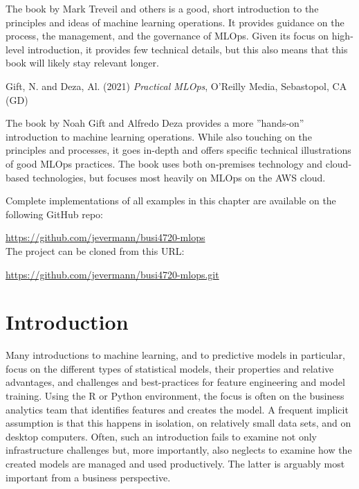 The book by Mark Treveil and others is a good, short introduction to the principles and ideas of machine learning operations. It provides guidance on the process, the management, and the governance of MLOps. Given its focus on high-level introduction, it provides few technical details, but this also means that this book will likely stay relevant longer. 


\begin{resourcebox}
Gift, N. and Deza, Al. (2021) \emph{Practical MLOps}, O'Reilly Media, Sebastopol, CA (GD)
\end{resourcebox}

The book by Noah Gift and Alfredo Deza provides a more ''hands-on'' introduction to machine learning operations. While also touching on the principles and processes, it goes in-depth and offers specific technical illustrations of good MLOps practices. The book uses both on-premises technology and cloud-based technologies, but focuses most heavily on MLOps on the AWS cloud. 


\begin{resourcebox}
Complete implementations of all examples in this chapter are available on the following GitHub repo:

\small\url{https://github.com/jevermann/busi4720-mlops}\normalsize \\

The project can be cloned from this URL:

\small\url{https://github.com/jevermann/busi4720-mlops.git}\normalsize
\end{resourcebox}


\section{Introduction}

Many introductions to machine learning, and to predictive models in particular, focus on the different types of statistical models, their properties and relative advantages, and challenges and best-practices for feature engineering and model training. Using the R or Python environment, the focus is often on the business analytics team that identifies features and creates the model. A frequent implicit assumption is that this happens in isolation, on relatively small data sets, and on desktop computers. Often, such an introduction fails to examine not only infrastructure challenges but, more importantly, also neglects to examine how the created models are managed and used productively. The latter is arguably most important from a business perspective.

